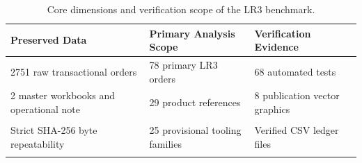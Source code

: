 \begin{table}[!htbp]
\centering
\caption{Core dimensions and verification scope of the LR3 benchmark.}
\label{tab:delivery_scope}
\renewcommand{\arraystretch}{1.15}
\small
\begin{tabularx}{\textwidth}{lXX}
\toprule
\textbf{Preserved Data} & \textbf{Primary Analysis Scope} & \textbf{Verification Evidence} \\
\midrule
2751 raw transactional orders & 78 primary LR3 orders & 68 automated tests \\
2 master workbooks and operational note & 29 product references & 8 publication vector graphics \\\\
Strict SHA-256 byte repeatability & 25 provisional tooling families & Verified CSV ledger files \\\\
\bottomrule
\end{tabularx}
\end{table}
